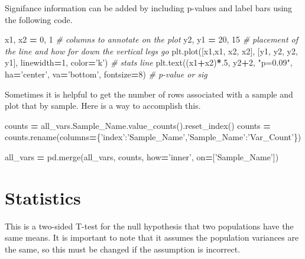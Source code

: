 \documentclass[]{book}
\newenvironment{Shaded}{\begin{snugshade}}{\end{snugshade}}
\newcommand{\DecValTok}[1]{\textcolor[rgb]{0.00,0.00,0.81}{#1}}
\newcommand{\StringTok}[1]{\textcolor[rgb]{0.31,0.60,0.02}{#1}}
\newcommand{\CommentTok}[1]{\textcolor[rgb]{0.56,0.35,0.01}{\textit{#1}}}
\newcommand{\OperatorTok}[1]{\textcolor[rgb]{0.81,0.36,0.00}{\textbf{#1}}}
\newcommand{\NormalTok}[1]{#1}
\begin{document}
Signifance information can be added by including p-values and label bars
using the following code.

\begin{Shaded}
\begin{Highlighting}[]
\NormalTok{x1, x2 }\OperatorTok{=} \DecValTok{0}\NormalTok{, }\DecValTok{1} \CommentTok{# columns to annotate on the plot}
\NormalTok{y2, y1 }\OperatorTok{=} \DecValTok{20}\NormalTok{, }\DecValTok{15} \CommentTok{# placement of the line and how for down the vertical legs go}
\NormalTok{plt.plot([x1,x1, x2, x2], [y1, y2, y2, y1], linewidth}\OperatorTok{=}\DecValTok{1}\NormalTok{, color}\OperatorTok{=}\StringTok{'k'}\NormalTok{) }\CommentTok{# stats line}
\NormalTok{plt.text((x1}\OperatorTok{+}\NormalTok{x2)}\OperatorTok{*}\NormalTok{.}\DecValTok{5}\NormalTok{, y2}\OperatorTok{+}\DecValTok{2}\NormalTok{, }\StringTok{"p=0.09"}\NormalTok{, ha}\OperatorTok{=}\StringTok{'center'}\NormalTok{, va}\OperatorTok{=}\StringTok{'bottom'}\NormalTok{, fontsize}\OperatorTok{=}\DecValTok{8}\NormalTok{) }\CommentTok{# p-value or sig}
\end{Highlighting}
\end{Shaded}

Sometimes it is helpful to get the number of rows associated with a
sample and plot that by sample. Here is a way to accomplish this.

\begin{Shaded}
\begin{Highlighting}[]
\NormalTok{counts }\OperatorTok{=}\NormalTok{ all_vars.Sample_Name.value_counts().reset_index()}
\NormalTok{counts }\OperatorTok{=}\NormalTok{ counts.rename(columns}\OperatorTok{=}\NormalTok{\{}\StringTok{'index'}\NormalTok{:}\StringTok{'Sample_Name'}\NormalTok{,}\StringTok{'Sample_Name'}\NormalTok{:}\StringTok{'Var_Count'}\NormalTok{\})}

\NormalTok{all_vars }\OperatorTok{=}\NormalTok{ pd.merge(all_vars, counts, how}\OperatorTok{=}\StringTok{'inner'}\NormalTok{, on}\OperatorTok{=}\NormalTok{[}\StringTok{'Sample_Name'}\NormalTok{])}
\end{Highlighting}
\end{Shaded}

\section{Statistics}\label{statistics}

This is a two-sided T-test for the null hypothesis that two populations
have the same means. It is important to note that it assumes the
population variances are the same, so this must be changed if the
assumption is incorrect.
\end{document}
